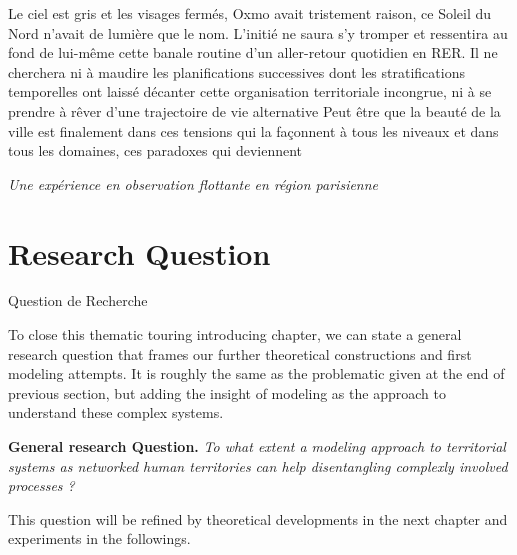 \begin{mdframed}
Le ciel est gris et les visages fermés, Oxmo avait tristement raison, ce Soleil du Nord n'avait de lumière que le nom. L'initié ne saura s'y tromper et ressentira au fond de lui-même cette banale routine d'un aller-retour quotidien en RER. Il ne cherchera ni à maudire les planifications successives dont les stratifications temporelles ont laissé décanter cette organisation territoriale incongrue, ni à se prendre à rêver d'une trajectoire de vie alternative
Peut être que la beauté de la ville est finalement dans ces tensions qui la façonnent à tous les niveaux et dans tous les domaines, ces paradoxes qui deviennent

 \textit{Une expérience en observation flottante en région parisienne}
\end{mdframed}








\section{Research Question}{Question de Recherche}

To close this thematic touring introducing chapter, we can state a general research question that frames our further theoretical constructions and first modeling attempts. It is roughly the same as the problematic given at the end of previous section, but adding the insight of modeling as the approach to understand these complex systems.


\medskip

\textbf{General research Question.} \textit{To what extent a modeling approach to territorial systems as networked human territories can help disentangling complexly involved processes ?}


\medskip

This question will be refined by theoretical developments in the next chapter and experiments in the followings.






